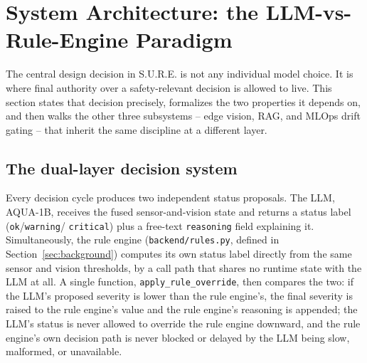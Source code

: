 \section{System Architecture: the LLM-vs-Rule-Engine Paradigm}
\label{sec:system-architecture}

The central design decision in S.U.R.E. is not any individual model choice. It is where final
authority over a safety-relevant decision is allowed to live. This section states that decision
precisely, formalizes the two properties it depends on, and then walks the other three subsystems
-- edge vision, RAG, and MLOps drift gating -- that inherit the same discipline at a different
layer.

\subsection{The dual-layer decision system}
\label{sec:dual-layer}

Every decision cycle produces two independent status proposals. The LLM, AQUA-1B, receives the
fused sensor-and-vision state and returns a status label (\texttt{ok}/\texttt{warning}/
\texttt{critical}) plus a free-text \texttt{reasoning} field explaining it. Simultaneously, the
rule engine (\texttt{backend/rules.py}, defined in Section~\ref{sec:background}) computes its own
status label directly from the same sensor and vision thresholds, by a call path that shares no
runtime state with the LLM at all. A single function, \texttt{apply\_rule\_override}, then compares
the two: if the LLM's proposed severity is lower than the rule engine's, the final severity is
raised to the rule engine's value and the rule engine's reasoning is appended; the LLM's status is
never allowed to override the rule engine downward, and the rule engine's own decision path is
never blocked or delayed by the LLM being slow, malformed, or unavailable.

